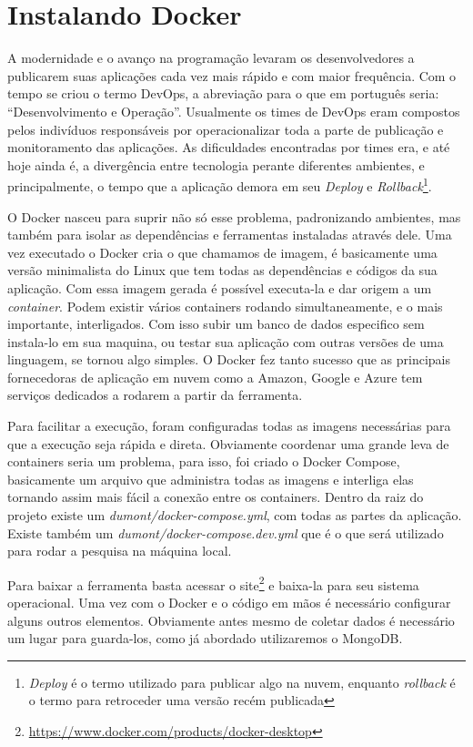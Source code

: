 \chapter{Instalando Docker}
A modernidade e o avanço na programação levaram os desenvolvedores a publicarem suas aplicações cada vez mais rápido e com maior frequência. Com o tempo se criou o termo DevOps, a abreviação para o que em português seria: “Desenvolvimento e Operação”. Usualmente os times de DevOps eram compostos pelos indivíduos responsáveis por operacionalizar toda a parte de publicação e monitoramento das aplicações. As dificuldades encontradas por times era, e até hoje ainda é, a divergência entre tecnologia perante diferentes ambientes, e principalmente, o tempo que a aplicação demora em seu \textit{Deploy} e \textit{Rollback}\footnote{\textit{Deploy} é o termo utilizado para publicar algo na nuvem, enquanto \textit{rollback} é o termo para retroceder uma versão recém publicada}.

O Docker nasceu para suprir não só esse problema, padronizando ambientes, mas também para isolar as dependências e ferramentas instaladas através dele. Uma vez executado o Docker cria o que chamamos de imagem, é basicamente uma versão minimalista do Linux que tem todas as dependências e códigos da sua aplicação. Com essa imagem gerada é possível executa-la e dar origem a um \textit{container}. Podem existir vários containers rodando simultaneamente, e o mais importante, interligados. Com isso subir um banco de dados especifico sem instala-lo em sua maquina, ou testar sua aplicação com outras versões de uma linguagem, se tornou algo simples. O Docker fez tanto sucesso que as principais fornecedoras de aplicação em nuvem como a Amazon, Google e Azure tem serviços dedicados a rodarem a partir da ferramenta.

Para facilitar a execução, foram configuradas todas as imagens necessárias para que a execução seja rápida e direta. Obviamente coordenar uma grande leva de containers seria um problema, para isso, foi criado o Docker Compose, basicamente um arquivo que administra todas as imagens e interliga elas tornando assim mais fácil a conexão entre os containers. Dentro da raiz do projeto existe um \textit{dumont/docker-compose.yml}, com todas as partes da aplicação. Existe também um \textit{dumont/docker-compose.dev.yml} que é o que será utilizado para rodar a pesquisa na máquina local.

Para baixar a ferramenta basta acessar o site\footnote{\url{https://www.docker.com/products/docker-desktop}} e baixa-la para seu sistema operacional. Uma vez com o Docker e o código em mãos é necessário configurar alguns outros elementos. Obviamente antes mesmo de coletar dados é necessário um lugar para guarda-los, como já abordado utilizaremos o MongoDB.

